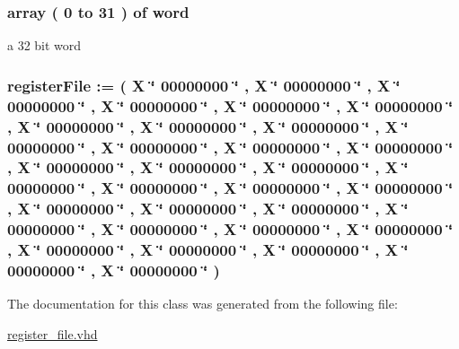 \hypertarget{classregister__file_1_1behavioral_a312e330e12c981e3094d8419afb16a58}{
\subsubsection[{register\-File}]{ {\bfseries array (  0    to    31  )  of {\bfseries {\bf word}}  } }}\label{classregister__file_1_1behavioral_a312e330e12c981e3094d8419afb16a58}
a 32 bit word \hypertarget{classregister__file_1_1behavioral_ab8a5b65dc9034963fa0d029a5d7c5534}{
\subsubsection[{register\-\_\-file}]{ {\bfseries {\bfseries {\bf register\-File}}   \-:=  (  \-X \char`\"{} 00000000 \char`\"{} ,  \-X \char`\"{} 00000000 \char`\"{} ,  \-X \char`\"{} 00000000 \char`\"{} ,  \-X \char`\"{} 00000000 \char`\"{} ,  \-X \char`\"{} 00000000 \char`\"{} ,  \-X \char`\"{} 00000000 \char`\"{} ,  \-X \char`\"{} 00000000 \char`\"{} ,  \-X \char`\"{} 00000000 \char`\"{} ,  \-X \char`\"{} 00000000 \char`\"{} ,  \-X \char`\"{} 00000000 \char`\"{} ,  \-X \char`\"{} 00000000 \char`\"{} ,  \-X \char`\"{} 00000000 \char`\"{} ,  \-X \char`\"{} 00000000 \char`\"{} ,  \-X \char`\"{} 00000000 \char`\"{} ,  \-X \char`\"{} 00000000 \char`\"{} ,  \-X \char`\"{} 00000000 \char`\"{} ,  \-X \char`\"{} 00000000 \char`\"{} ,  \-X \char`\"{} 00000000 \char`\"{} ,  \-X \char`\"{} 00000000 \char`\"{} ,  \-X \char`\"{} 00000000 \char`\"{} ,  \-X \char`\"{} 00000000 \char`\"{} ,  \-X \char`\"{} 00000000 \char`\"{} ,  \-X \char`\"{} 00000000 \char`\"{} ,  \-X \char`\"{} 00000000 \char`\"{} ,  \-X \char`\"{} 00000000 \char`\"{} ,  \-X \char`\"{} 00000000 \char`\"{} ,  \-X \char`\"{} 00000000 \char`\"{} ,  \-X \char`\"{} 00000000 \char`\"{} ,  \-X \char`\"{} 00000000 \char`\"{} ,  \-X \char`\"{} 00000000 \char`\"{} ,  \-X \char`\"{} 00000000 \char`\"{} ,  \-X \char`\"{} 00000000 \char`\"{}  ) } }}\label{classregister__file_1_1behavioral_ab8a5b65dc9034963fa0d029a5d7c5534}


\-The documentation for this class was generated from the following file\-:\begin{DoxyCompactItemize}
\item 
\hyperlink{register__file_8vhd}{register\-\_\-file.\-vhd}\end{DoxyCompactItemize}
